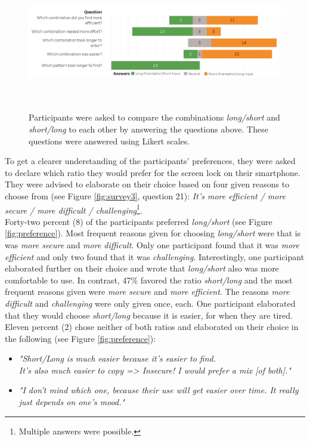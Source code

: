 \begin{figure}[t!]
\centering
\includegraphics[width=15cm, height=6cm]{Chapters/graphics/comparison.PNG}
\caption{Participants were asked to compare the combinations \textit{long/short} and \textit{short/long} to each other by answering the questions above. These questions were answered using Likert scales. }
\label{fig:likert2}
\end{figure}

To get a clearer understanding of the participants' preferences, they were asked to declare which ratio they would prefer for the screen lock on their smartphone. They were advised to elaborate on their choice based on four given reasons to choose from (see Figure \ref{fig:survey3}, question 21): \textit{It's more efficient / more secure / more difficult / challenging}\footnote{Multiple answers were possible.}.\\
Forty-two percent (8) of the participants preferred \textit{long/short} (see Figure \ref{fig:preference}). Most frequent reasons given for choosing \textit{long/short} were that is was \textit{more secure} and \textit{more difficult}. Only one participant found that it was \textit{more efficient} and only two found that it was \textit{challenging}. Interestingly, one participant elaborated further on their choice and wrote that \textit{long/short} also was more comfortable to use. In contrast, 47\% favored the ratio \textit{short/long} and the most frequent reasons given were \textit{more secure} and \textit{more efficient}. The reasons \textit{more difficult} and \textit{challenging} were only given once, each. One participant elaborated that they would choose \textit{short/long} because it is easier, for when they are tired. Eleven percent (2) chose neither of both ratios and elaborated on their choice in the following (see Figure \ref{fig:preference}): 
\begin{itemize}
    \item \textit{"Short/Long is much easier because it's easier to find.\\ It's also much easier to copy => Insecure! I would prefer a mix [of both]."}
    \item \textit{"I don't mind which one, because their use will get easier over time. It really just depends on one's mood."} 
\end{itemize}

